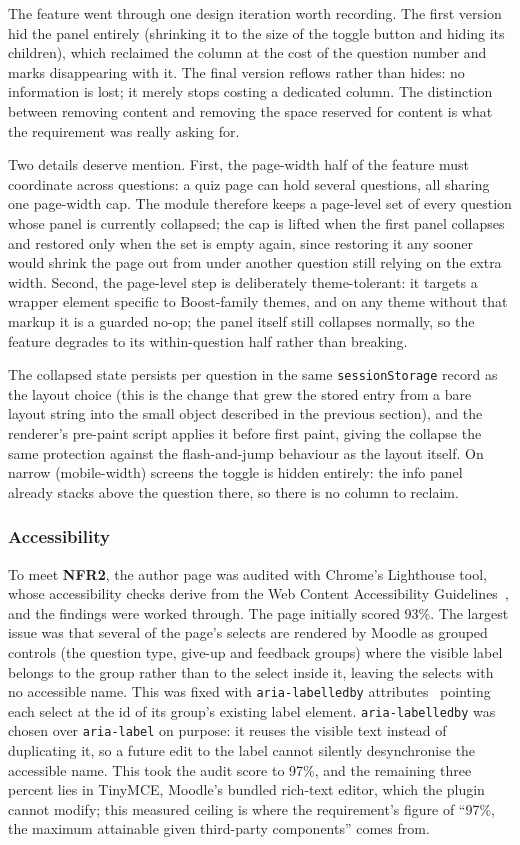 The feature went through one design iteration worth recording. The first version hid the panel entirely (shrinking it to the size of the toggle button and hiding its children), which reclaimed the column at the cost of the question number and marks disappearing with it. The final version reflows rather than hides: no information is lost; it merely stops costing a dedicated column. The distinction between removing content and removing the space reserved for content is what the requirement was really asking for.

Two details deserve mention. First, the page-width half of the feature must coordinate across questions: a quiz page can hold several questions, all sharing one page-width cap. The module therefore keeps a page-level set of every question whose panel is currently collapsed; the cap is lifted when the first panel collapses and restored only when the set is empty again, since restoring it any sooner would shrink the page out from under another question still relying on the extra width. Second, the page-level step is deliberately theme-tolerant: it targets a wrapper element specific to Boost-family themes, and on any theme without that markup it is a guarded no-op; the panel itself still collapses normally, so the feature degrades to its within-question half rather than breaking.

The collapsed state persists per question in the same \texttt{sessionStorage} record as the layout choice (this is the change that grew the stored entry from a bare layout string into the small object described in the previous section), and the renderer's pre-paint script applies it before first paint, giving the collapse the same protection against the flash-and-jump behaviour as the layout itself. On narrow (mobile-width) screens the toggle is hidden entirely: the info panel already stacks above the question there, so there is no column to reclaim.

\subsubsection{Accessibility}
To meet \textbf{NFR2}, the author page was audited with Chrome's Lighthouse tool, whose accessibility checks derive from the Web Content Accessibility Guidelines~\cite{w3c_wcag22_2023}, and the findings were worked through. The page initially scored 93\%. The largest issue was that several of the page's selects are rendered by Moodle as grouped controls (the question type, give-up and feedback groups) where the visible label belongs to the group rather than to the select inside it, leaving the selects with no accessible name. This was fixed with \texttt{aria-labelledby} attributes~\cite{w3c_wai_aria12_2023} pointing each select at the id of its group's existing label element. \texttt{aria-labelledby} was chosen over \texttt{aria-label} on purpose: it reuses the visible text instead of duplicating it, so a future edit to the label cannot silently desynchronise the accessible name. This took the audit score to 97\%, and the remaining three percent lies in TinyMCE, Moodle's bundled rich-text editor, which the plugin cannot modify; this measured ceiling is where the requirement's figure of ``97\%, the maximum attainable given third-party components'' comes from.

